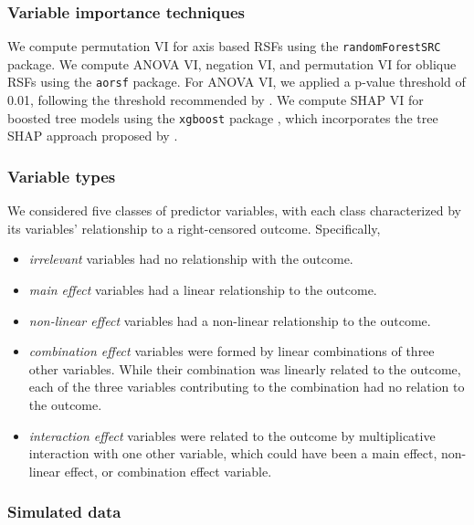 \documentclass{article}\usepackage[]{graphicx}\usepackage[]{xcolor}
\begin{document}
\subsubsection{Variable importance techniques}

We compute permutation VI for axis based RSFs using the \texttt{randomForestSRC} package. We compute ANOVA VI, negation VI, and permutation VI for oblique RSFs using the \texttt{aorsf} package. For ANOVA VI, we applied a p-value threshold of 0.01, following the threshold recommended by \citet{menze2011oblique}. We compute SHAP VI for boosted tree models using the \texttt{xgboost} package \citep{xgboost}, which incorporates the tree SHAP approach proposed by \citet{lundberg2018consistent}.


\subsubsection{Variable types}

We considered five classes of predictor variables, with each class characterized by its variables' relationship to a right-censored outcome. Specifically, \begin{itemize}
\item \textit{irrelevant} variables had no relationship with the outcome.
\item \textit{main effect} variables had a linear relationship to the outcome.
\item \textit{non-linear effect} variables had a non-linear relationship to the outcome.
\item \textit{combination effect} variables were formed by linear combinations of three other variables. While their combination was linearly related to the outcome, each of the three variables contributing to the combination had no relation to the outcome.
\item \textit{interaction effect} variables were related to the outcome by multiplicative interaction with one other variable, which could have been a main effect, non-linear effect, or combination effect variable.
\end{itemize}


\subsubsection{Simulated data}
\end{document}
